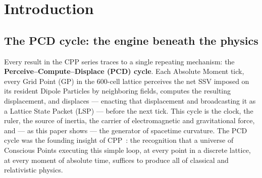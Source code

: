 \documentclass[12pt]{article}
\newcommand{\lP}{l_P}
\newcommand{\SSV}{\text{SSV}}
\newcommand{\PSR}{\text{PSR}}
\begin{document}
\begin{abstract}
We extend the weak-field GR results of companion~7 to the full
nonlinear regime.  The PSR formula
$\PSR_{\rm eff}(r) = \lP/(1 + k\,\Delta|\SSV|(r))$,
combined with the shell-broadcast source equation
$k\,\Delta|\SSV| = GM/rc^2$ (exact, from the Newtonian Gravity
companion), yields the Schwarzschild metric in isotropic coordinates
without approximation (Theorem~\ref{thm:schwarzschild}).
Standard Schwarzschild follows by coordinate transformation.
The CPP field equation governing the self-consistent LSP distribution
is identified as a nonlinear wave equation for $\Delta\SSV$ that
reduces to the linearised Einstein equations in the weak-field limit
(Proposition~\ref{prop:field_eq}).
The CP Exclusion Rule imposes a minimum lattice spacing
$\PSR_{\rm eff} \geq \lP/2$, preventing the metric from reaching zero
at $r = 0$ and replacing the GR singularity with a Planck-density core
(Theorem~\ref{thm:core}).
Additional predictions include a Planck remnant from Hawking evaporation,
suppressed scalar/vector gravitational wave modes, and a qualitative
derivation of the Kerr frame-dragging term from the angular SSV curl.
No new postulates are introduced beyond those of Version~16.
\end{abstract}

\section{Introduction}
\label{sec:intro}

\subsection*{The PCD cycle: the engine beneath the physics}

Every result in the CPP series traces to a single repeating mechanism:
the \textbf{Perceive--Compute--Displace (PCD) cycle}.  Each Absolute
Moment tick, every Grid Point (GP) in the 600-cell lattice perceives
the net SSV imposed on its resident Dipole Particles by neighboring
fields, computes the resulting displacement, and displaces --- enacting
that displacement and broadcasting it as a Lattice State Packet (LSP)
--- before the next tick.
This cycle is the clock, the ruler, the source of inertia, the
carrier of electromagnetic and gravitational force, and --- as this
paper shows --- the generator of spacetime curvature.  The PCD cycle
was the founding insight of CPP~\cite{v16}: the recognition that a
universe of Conscious Points executing this simple loop, at every point
in a discrete lattice, at every moment of absolute time, suffices to
produce all of classical and relativistic physics.
\end{document}
